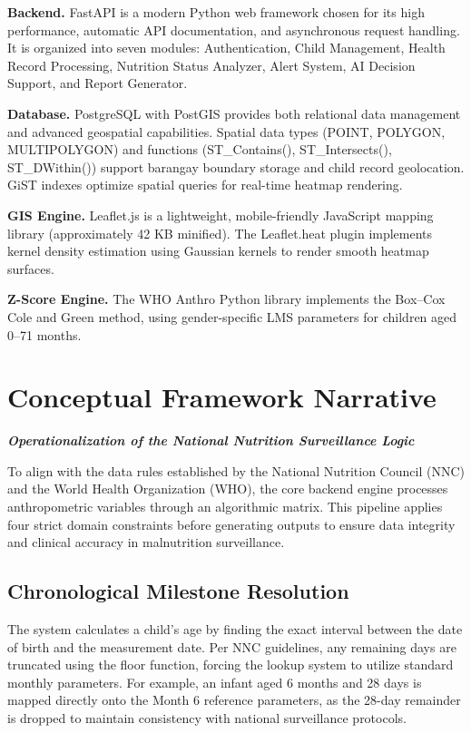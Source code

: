 \documentclass[12pt, a4paper]{report}
\begin{document}
\noindent \textbf{Backend.} FastAPI is a modern Python web framework chosen for its high performance, automatic API documentation, and asynchronous request handling. It is organized into seven modules: Authentication, Child Management, Health Record Processing, Nutrition Status Analyzer, Alert System, AI Decision Support, and Report Generator.

\noindent \textbf{Database.} PostgreSQL with PostGIS provides both relational data management and advanced geospatial capabilities. Spatial data types (POINT, POLYGON, MULTIPOLYGON) and functions (ST\_Contains(), ST\_Intersects(), ST\_DWithin()) support barangay boundary storage and child record geolocation. GiST indexes optimize spatial queries for real-time heatmap rendering.

\noindent \textbf{GIS Engine.} Leaflet.js is a lightweight, mobile-friendly JavaScript mapping library (approximately 42 KB minified). The Leaflet.heat plugin implements kernel density estimation using Gaussian kernels to render smooth heatmap surfaces.

\noindent \textbf{Z-Score Engine.} The WHO Anthro Python library implements the Box--Cox Cole and Green method, using gender-specific LMS parameters for children aged 0--71 months.

\section{Conceptual Framework Narrative}
\label{sec:conceptual}

\noindent \textbf{\textit{Operationalization of the National Nutrition Surveillance Logic}}

To align with the data rules established by the National Nutrition Council (NNC) and the World Health Organization (WHO), the core backend engine processes anthropometric variables through an algorithmic matrix. This pipeline applies four strict domain constraints before generating outputs to ensure data integrity and clinical accuracy in malnutrition surveillance.

\subsection{Chronological Milestone Resolution}
\label{subsec:chronological}
The system calculates a child's age by finding the exact interval between the date of birth and the measurement date. Per NNC guidelines, any remaining days are truncated using the floor function, forcing the lookup system to utilize standard monthly parameters.
For example, an infant aged 6 months and 28 days is mapped directly onto the Month 6 reference parameters, as the 28-day remainder is dropped to maintain consistency with national surveillance protocols.
\end{document}
